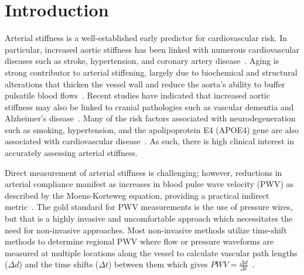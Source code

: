\section{Introduction}\label{sec:life_intro}
Arterial stiffness is a well-established early predictor for cardiovascular risk. In particular, increased aortic stiffness has been linked with numerous cardiovascular diseases such as stroke, hypertension, and coronary artery disease~\cite{sutton-tyrrellElevatedAorticPulse2005}. Aging is strong contributor to arterial stiffening, largely due to biochemical and structural alterations that thicken the vessel wall and reduce the aorta's ability to buffer pulsatile blood flows~\cite{vatnerVascularStiffnessAging2021,cavalcanteAorticStiffness2011}. Recent studies have indicated that increased aortic stiffness may also be linked to cranial pathologies such as vascular dementia and Alzheimer's disease~\cite{deroosMagneticResonanceImaging2017,batemanPulseWaveEncephalopathy2004}. Many of the risk factors associated with neurodegeneration such as smoking, hypertension, and the apolipoprotein E4 (APOE4) gene are also associated with cardiovascular disease~\cite{hughesReviewPotentialRole2015,nordestgaardSharedRiskFactors2022,angoffAorticStiffnessEpidemiology2021}. As such, there is high clinical interest in accurately assessing arterial stiffness. 

Direct measurement of arterial stiffness is challenging; however, reductions in arterial compliance manifest as increases in blood pulse wave velocity (PWV) as described by the Moens-Korteweg equation, providing a practical indirect metric~\cite{callaghanRelationshipPulsewaveVelocity1986}. The gold standard for PWV measurements is the use of pressure wires, but that is a highly invasive and uncomfortable approach which necessitates the need for non-invasive approaches. Most non-invasive methods utilize time-shift methods to determine regional PWV where flow or pressure waveforms are measured at multiple locations along the vessel to calculate vascular path lengths ($\Delta d$) and the time shifts ($\Delta t$) between them which gives $PWV=\frac{\Delta d}{\Delta t}$~\cite{wentlandReviewMRIbasedMeasurements2014}. 

